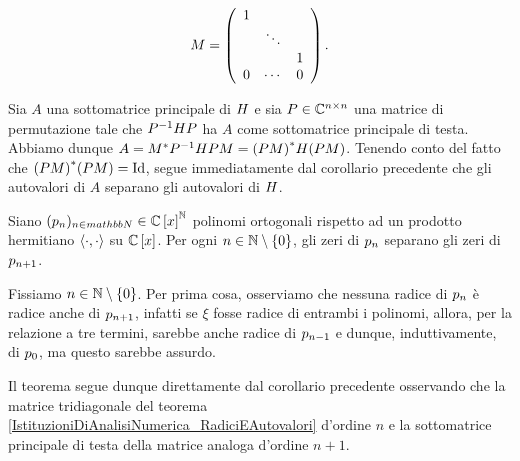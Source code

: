 \[
	M = \left (
	\begin{array}{ccc}
	1 & &\\
	& \ddots &\\
	& & 1\\
	0 & \cdots & 0
	\end{array}
	\right ).
\]
\par Sia $A$ una sottomatrice principale di $H$ e sia $P \in \mathbb{C}^{n \times n}$ una matrice di permutazione tale che $P^{-1} H P$ ha $A$ come sottomatrice principale di testa. Abbiamo dunque $A = {M}^* P^{-1} H P M = {(P M)}^* H (P M)$. Tenendo conto del fatto che $\HermitianTransposed{(\PermutationMatrix M)} (\PermutationMatrix M) = \Identity$, segue immediatamente dal corollario precedente che gli autovalori di $A$ separano gli autovalori di $H$. \EndProof
\begin{Theorem}
	 Siano $(p_n)_{n \in \\mathbb{N}} \in \mathbb{C} \left [ x \right ]^\mathbb{N}$ polinomi ortogonali rispetto ad un prodotto hermitiano $\left \langle \cdot , \cdot \right \rangle$ su $\mathbb{C} \left [ x \right ]$. Per ogni $n \in \mathbb{N} \setminus \lbrace 0 \rbrace$, gli zeri di $p_n$ separano gli zeri di $p_{n + 1}$.
\end{Theorem}
\Proof Fissiamo $n \in \mathbb{N} \setminus \lbrace 0 \rbrace$. Per prima cosa, osserviamo che nessuna radice di $p_n$ \`e radice anche di $p_{n + 1}$, infatti se $\xi$ fosse radice di entrambi i polinomi, allora, per la relazione a tre termini, sarebbe anche radice di $p_{n - 1}$ e dunque, induttivamente, di $p_0$, ma questo sarebbe assurdo.
\par Il teorema segue dunque direttamente dal corollario precedente osservando che la matrice tridiagonale del teorema \ref{IstituzioniDiAnalisiNumerica_RadiciEAutovalori} d'ordine $n$ e la sottomatrice principale di testa della matrice analoga d'ordine $n + 1$. \EndProof
